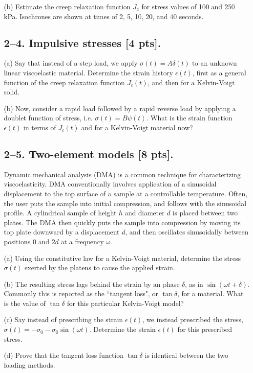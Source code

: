 \medskip
(b) Estimate the creep relaxation function $J_c$ for stress values of 100 and 250 kPa. Isochrones are shown at times of 2, 5, 10, 20, and 40 seconds.   

\bigskip
\subsection*{2--4. \textbf{Impulsive stresses} [4 pts].}

(a) Say that instead of a step load, we apply $\sigma(t) = A \delta(t)$ to an unknown linear viscoelastic material. 
Determine the strain history $\epsilon(t)$, first as a general function of the creep relaxation function $J_c(t)$, and then for a Kelvin-Voigt solid. 

(b) Now, consider a rapid load followed by a rapid reverse load by applying a doublet function of stress, i.e. $\sigma(t) = B \psi(t)$. 
What is the strain function $\epsilon(t)$ in terms of $J_c(t)$ and for a Kelvin-Voigt material now? 

\bigskip
\subsection*{2--5. \textbf{Two-element models} [8 pts].}

Dynamic mechanical analysis (DMA) is a common technique for characterizing viscoelasticity. 
DMA conventionally involves application of a sinusoidal displacement to the top surface of a sample at a controllable temperature. 
Often, the user puts the sample into initial compression, and follows with the sinusoidal profile. 
A cylindrical sample of height $h$ and diameter $d$ is placed between two plates.
The DMA then quickly puts the sample into compression by moving its top plate downward by a displacement $d$, and then oscillates sinusoidally between positions $0$ and $2d$ at a frequency $\omega$.

\medskip
(a) Using the constitutive law for a Kelvin-Voigt material, determine the stress $\sigma(t)$ exerted by the platens to cause the applied strain. 

\medskip
(b) The resulting stress lags behind the strain by an phase $\delta$, as in $\sin(\omega t + \delta)$. 
Commonly this is reported as the ``tangent loss", or $\tan\delta$, for a material. 
What is the value of $\tan\delta$ for this particular Kelvin-Voigt model?

\medskip
(c) Say instead of prescribing the strain $\epsilon(t)$, we instead prescribed the stress, $\sigma(t) = - \sigma_0 - \sigma_0 \sin(\omega t)$. 
Determine the strain $\epsilon(t)$ for this prescribed stress.

\medskip
(d) Prove that the tangent loss function $\tan\delta$ is identical between the two loading methods.